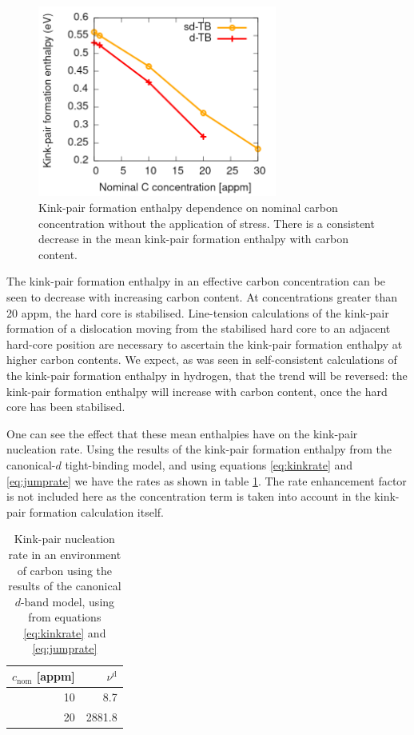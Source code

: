 \documentclass[a4paper,11pt]{article}
\begin{document}
\begin{figure}[htbp]
\centering
\includegraphics[width=0.7\textwidth]{Images/kink-pair_formation_equilibrium_sdtb_dtb_30appm.png}
\caption{Kink-pair formation enthalpy dependence on nominal carbon concentration without the application of stress. There is a consistent decrease in the mean kink-pair formation enthalpy with carbon content.}
\end{figure}

The kink-pair formation enthalpy in an effective carbon concentration can be
seen to decrease with increasing carbon content. At concentrations greater
than 20 appm, the hard core is stabilised. Line-tension calculations of the
kink-pair formation of a dislocation moving from the stabilised hard
core to an adjacent hard-core position are necessary to ascertain the
kink-pair formation enthalpy at higher carbon contents. We expect, as
was seen in self-consistent calculations of the kink-pair formation enthalpy
in hydrogen, that the trend will be reversed: the kink-pair formation
enthalpy will increase with carbon content, once the hard core has been stabilised.


One can see the effect that these mean enthalpies have on the kink-pair nucleation
rate. Using the results of the kink-pair formation enthalpy from the canonical-\(d\)
tight-binding model, and using equations \eqref{eq:kinkrate} and \eqref{eq:jumprate}
we have the rates as shown in table \ref{eqkinkrate}. The rate enhancement factor is not
included here as the concentration term is taken into account in the
kink-pair formation calculation itself.

\begin{table}[htbp]
\caption{Kink-pair nucleation rate in an environment of carbon using the results of the canonical \(d \text{-band}\) model, using from equations \eqref{eq:kinkrate} and \eqref{eq:jumprate} \label{eqkinkrate}}
\centering
\begin{tabular}{rr}
\(c_{\text{nom}}\) [appm] & \(\nu^{\text{d}}\)\\
\hline
10 & 8.7\\
20 & 2881.8\\
\end{tabular}
\end{table}
\end{document}
